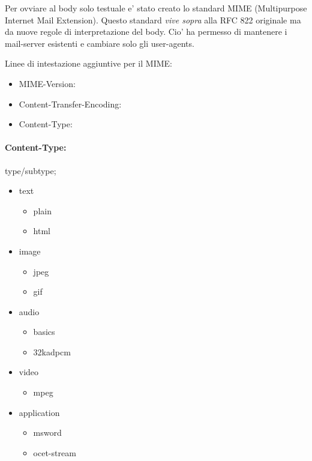 Per ovviare al body solo testuale e' stato creato lo standard MIME (Multipurpose Internet Mail Extension).
Questo standard \textit{vive sopra} alla RFC 822 originale ma da nuove regole di interpretazione del body. Cio' ha permesso di mantenere i mail-server esistenti e cambiare solo gli user-agents.

Linee di intestazione aggiuntive per il MIME:
\begin{itemize}
    \item MIME-Version:
    \item Content-Transfer-Encoding:
    \item Content-Type:
\end{itemize}

\paragraph{Content-Type:}
type/subtype;
\begin{multicols}{2}
\begin{itemize}
    \item text
    \begin{itemize}
        \item plain
        \item html
    \end{itemize}
    \item image
    \begin{itemize}
        \item jpeg
        \item gif
    \end{itemize}
    \columnbreak
    \item audio
    \begin{itemize}
        \item basics
        \item 32kadpcm
    \end{itemize}
    \item video
    \begin{itemize}
        \item mpeg
    \end{itemize}
    \item application
    \begin{itemize}
        \item msword
        \item ocet-stream
    \end{itemize}
\end{itemize}
\end{multicols}

